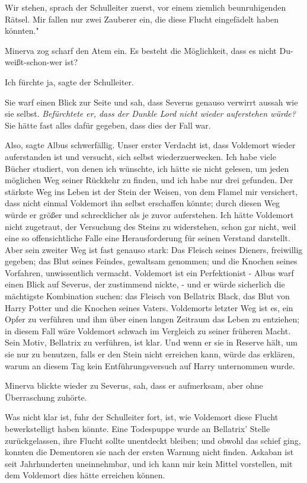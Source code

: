 \glqq Wir stehen\grqq{}, sprach der Schulleiter zuerst, \glqq vor einem ziemlich
beunruhigenden Rätsel. Mir fallen nur zwei Zauberer ein, die diese Flucht
eingefädelt haben könnten."

Minerva zog scharf den Atem ein. \glqq Es besteht die Möglichkeit, dass es nicht
Du-weißt-schon-wer ist?\grqq{}

\glqq Ich fürchte ja\grqq{}, sagte der Schulleiter.

Sie warf einen Blick zur Seite und sah, dass Severus genauso verwirrt aussah wie
sie selbst. \emph{Befürchtete er, dass der Dunkle Lord nicht wieder auferstehen
würde?} Sie hätte fast alles dafür gegeben, dass dies der Fall war.

\glqq Also\grqq{}, sagte Albus schwerfällig. \glqq Unser erster Verdacht ist,
dass Voldemort wieder auferstanden ist und versucht, sich selbst
wiederzuerwecken. Ich habe viele Bücher studiert, von denen ich wünschte, ich
hätte sie nicht gelesen, um jeden möglichen Weg seiner Rückkehr zu finden, und
ich habe nur drei gefunden. Der stärkste Weg ins Leben ist der Stein der Weisen,
von dem Flamel mir versichert, dass nicht einmal Voldemort ihn selbst erschaffen
könnte; durch diesen Weg würde er größer und schrecklicher als je zuvor
auferstehen. Ich hätte Voldemort nicht zugetraut, der Versuchung des Steins zu
widerstehen, schon gar nicht, weil eine so offensichtliche Falle eine
Herausforderung für seinen Verstand darstellt. Aber sein zweiter Weg ist fast
genauso stark: Das Fleisch seines Dieners, freiwillig gegeben; das Blut seines
Feindes, gewaltsam genommen; und die Knochen seines Vorfahren, unwissentlich
vermacht. Voldemort ist ein Perfektionist -\grqq{} Albus warf einen Blick auf
Severus, der zustimmend nickte, \glqq - und er würde sicherlich die mächtigste
Kombination suchen: das Fleisch von Bellatrix Black, das Blut von Harry Potter
und die Knochen seines Vaters. Voldemorts letzter Weg ist es, ein Opfer zu
verführen und ihm über einen langen Zeitraum das Leben zu entziehen; in diesem
Fall wäre Voldemort schwach im Vergleich zu seiner früheren Macht. Sein Motiv,
Bellatrix zu verführen, ist klar. Und wenn er sie in Reserve hält, um sie nur zu
benutzen, falls er den Stein nicht erreichen kann, würde das erklären, warum an
diesem Tag kein Entführungsversuch auf Harry unternommen wurde.\grqq{}

Minerva blickte wieder zu Severus, sah, dass er aufmerksam, aber ohne
Überraschung zuhörte.

\glqq Was nicht klar ist\grqq{}, fuhr der Schulleiter fort, \glqq ist, wie
Voldemort diese Flucht bewerkstelligt haben könnte. Eine Todespuppe wurde an
Bellatrix' Stelle zurückgelassen, ihre Flucht sollte unentdeckt bleiben; und
obwohl das schief ging, konnten die Dementoren sie nach der ersten Warnung nicht
finden. Askaban ist seit Jahrhunderten uneinnehmbar, und ich kann mir kein
Mittel vorstellen, mit dem Voldemort dies hätte erreichen können.\grqq{}

